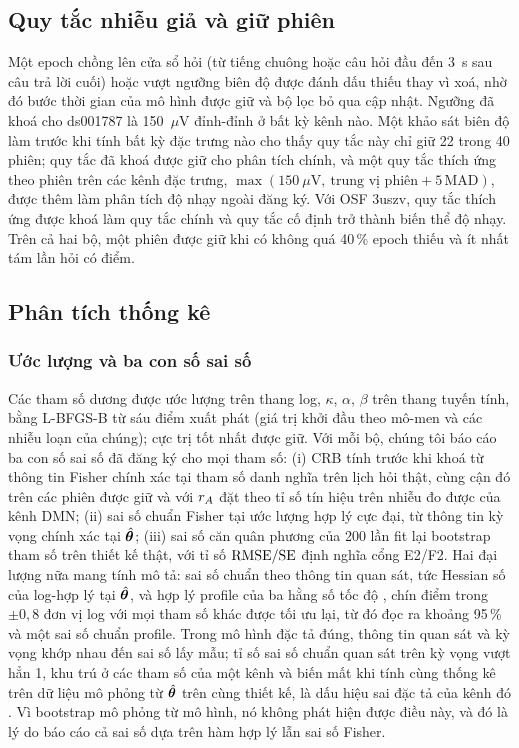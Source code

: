 \subsection{Quy tắc nhiễu giả và giữ phiên}
\label{sec:artefact}
Một epoch chồng lên cửa sổ hỏi (từ tiếng chuông hoặc câu hỏi đầu đến 3~s sau câu trả lời cuối) hoặc vượt ngưỡng biên độ được đánh dấu thiếu thay vì xoá, nhờ đó bước thời gian của mô hình được giữ và bộ lọc bỏ qua cập nhật. Ngưỡng đã khoá cho ds001787 là 150~$\mu$V đỉnh-đỉnh ở bất kỳ kênh nào. Một khảo sát biên độ làm trước khi tính bất kỳ đặc trưng nào cho thấy quy tắc này chỉ giữ 22 trong 40 phiên; quy tắc đã khoá được giữ cho phân tích chính, và một quy tắc thích ứng theo phiên trên các kênh đặc trưng, $\max(150~\mu\mathrm V,\ \text{trung vị phiên}+5\,\mathrm{MAD})$, được thêm làm phân tích độ nhạy ngoài đăng ký. Với OSF 3uszv, quy tắc thích ứng được khoá làm quy tắc chính và quy tắc cố định trở thành biến thể độ nhạy. Trên cả hai bộ, một phiên được giữ khi có không quá 40\,\% epoch thiếu và ít nhất tám lần hỏi có điểm.

\subsection{Phân tích thống kê}
\label{sec:stats}

\subsubsection{Ước lượng và ba con số sai số}
\label{sec:errors}
Các tham số dương được ước lượng trên thang log, $\kappa$, $\alpha$, $\beta$ trên thang tuyến tính, bằng L-BFGS-B \cite{Byrd1995} từ sáu điểm xuất phát (giá trị khởi đầu theo mô-men và các nhiễu loạn của chúng); cực trị tốt nhất được giữ. Với mỗi bộ, chúng tôi báo cáo ba con số sai số đã đăng ký cho mọi tham số: (i) CRB tính trước khi khoá từ thông tin Fisher chính xác tại tham số danh nghĩa trên lịch hỏi thật, cùng cận đó trên các phiên được giữ và với $r_{A}$ đặt theo tỉ số tín hiệu trên nhiễu đo được của kênh DMN; (ii) sai số chuẩn Fisher tại ước lượng hợp lý cực đại, từ thông tin kỳ vọng chính xác tại $\hat{\boldsymbol{\theta}}$; (iii) sai số căn quân phương của 200 lần fit lại bootstrap tham số \cite{Efron1993} trên thiết kế thật, với tỉ số $\mathrm{RMSE}/\mathrm{SE}$ định nghĩa cổng E2/F2. Hai đại lượng nữa mang tính mô tả: sai số chuẩn theo thông tin quan sát, tức Hessian số của log-hợp lý tại $\hat{\boldsymbol{\theta}}$, và hợp lý profile của ba hằng số tốc độ \cite{Raue2009}, chín điểm trong $\pm0{,}8$ đơn vị log với mọi tham số khác được tối ưu lại, từ đó đọc ra khoảng 95\,\% và một sai số chuẩn profile. Trong mô hình đặc tả đúng, thông tin quan sát và kỳ vọng khớp nhau đến sai số lấy mẫu; tỉ số sai số chuẩn quan sát trên kỳ vọng vượt hẳn 1, khu trú ở các tham số của một kênh và biến mất khi tính cùng thống kê trên dữ liệu mô phỏng từ $\hat{\boldsymbol{\theta}}$ trên cùng thiết kế, là dấu hiệu sai đặc tả của kênh đó \cite{White1982}. Vì bootstrap mô phỏng từ mô hình, nó không phát hiện được điều này, và đó là lý do báo cáo cả sai số dựa trên hàm hợp lý lẫn sai số Fisher.

